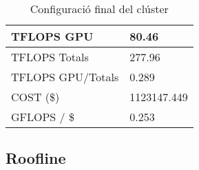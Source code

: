 \begin{table}[h!]
\begin{tabular}{|l|l|}
{\color[HTML]{000000} TFLOPS GPU}                & {\color[HTML]{000000} 80.46}                    \\ \hline
{\color[HTML]{000000} TFLOPS Totals}             & {\color[HTML]{000000} 277.96}                   \\ \hline
{\color[HTML]{000000} TFLOPS GPU/Totals}         & {\color[HTML]{000000} 0.289}                    \\ \hline
{\color[HTML]{000000} COST (\$)}                 & {\color[HTML]{000000} 1123147.449}              \\ \hline
{\color[HTML]{000000} GFLOPS / \$}               & {\color[HTML]{000000} 0.253}                    \\ \hline
\end{tabular}
\caption{Configuració final del clúster}
\end{table}



\subsection{Roofline}



